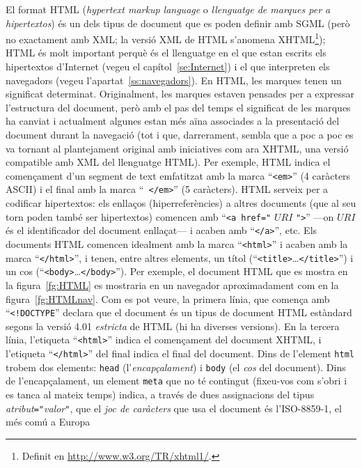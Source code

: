 El format HTML (\emph{hypertext markup language} o \emph{llenguatge de
  marques per a hipertextos}) és un dels tipus de document que es
poden definir amb SGML (però no exactament amb XML; la versió XML de
HTML s'anomena XHTML\footnote{Definit en
  \url{http://www.w3.org/TR/xhtml1/}.}); HTML és molt important perquè
és el llenguatge en el que estan escrits els hipertextos d'Internet
(vegeu el capítol~\ref{se:Internet}) i el que interpreten els
navegadors (vegeu l'apartat~\ref{ss:navegadors}). En HTML, les marques
tenen un significat determinat. Originalment, les marques estaven
pensades per a expressar l'estructura del document, però amb el pas
del temps el significat de les marques ha canviat i actualment algunes
estan més aïna associades a la presentació del document durant la
navegació (tot i que, darrerament, sembla que a poc a poc es va
tornant al plantejament original amb iniciatives com ara XHTML, una
versió compatible amb XML del llenguatge HTML). Per exemple, HTML
indica el començament d'un segment de text emfatitzat amb la marca
``{\tt <em>}'' (4 caràcters ASCII) i el final amb la marca ``{\tt
  </em>}'' (5 caràcters). HTML serveix per a codificar hipertextos:
els enllaços (hiperreferències) a altres documents (que al seu torn
poden també ser hipertextos) comencen amb ``\texttt{<a href="}
$\mathit{URI}$ \texttt{"}\texttt{>}'' ---on $\mathit{URI}$ és el
identificador del document enllaçat--- i acaben amb ``\texttt{</a>}'',
etc. Els documents HTML comencen idealment amb la marca
``\texttt{<html>}'' i acaben amb la marca ``\texttt{</html>}'', i
tenen, entre altres elements, un títol
(``\texttt{<title>}\ldots\texttt{</title>}'') i un cos
(``\texttt{<body>}\ldots\texttt{</body>}'').  Per exemple, el document
HTML que es mostra en la figura~\ref{fg:HTML} es mostraria en un
navegador aproximadament com en la figura~\ref{fg:HTMLnav}. Com es pot
veure, la primera línia, que comença amb ``\texttt{<!DOCTYPE}''
declara que el document és un tipus de document HTML estàndard segons
la versió 4.01 \emph{estricta} de HTML (hi ha diverses versions).  En
la tercera línia, l'etiqueta ``\texttt{<html>}'' indica el començament
del document XHTML, i l'etiqueta ``\texttt{</html>}'' del final indica
el final del document. Dins de l'element \texttt{html} trobem dos
elements: \texttt{head} (l'\emph{encapçalament}) i \texttt{body} (el
\emph{cos} del document).  Dins de l'encapçalament, un element
\texttt{meta} que no té contingut (fixeu-vos com s'obri i es tanca al
mateix temps) indica, a través de dues assignacions del tipus
\emph{atribut}\texttt{="}\emph{valor}\texttt{"}, que el \emph{joc de
  caràcters} que usa el document és l'ISO-8859-1, el més comú a Europa
